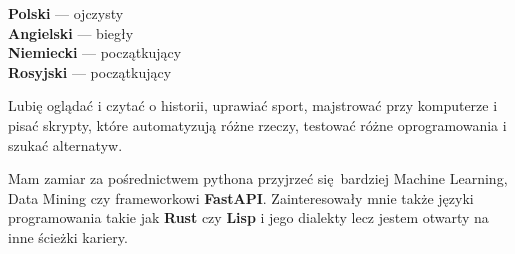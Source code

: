 \documentclass[9pt]{developercv} %
\begin{document}

\begin{minipage}[t]{0.3\textwidth}
    \vspace{-\baselineskip} %

    \textbf{Polski} --- ojczysty\\
    \textbf{Angielski} --- biegły\\
    \textbf{Niemiecki} --- początkujący\\
    \textbf{Rosyjski} --- początkujący
\end{minipage}
\hfill
\begin{minipage}[t]{0.3\textwidth}
    \vspace{-\baselineskip} %

    Lubię oglądać i czytać o historii, uprawiać sport, majstrować przy komputerze i pisać skrypty, które automatyzują różne rzeczy, testować różne oprogramowania i szukać alternatyw.
\end{minipage}
\hfill
\begin{minipage}[t]{0.3\textwidth}
	\vspace{-\baselineskip} %


    Mam zamiar za pośrednictwem pythona przyjrzeć się bardziej Machine Learning, Data Mining czy frameworkowi \textbf{FastAPI}. Zainteresowały mnie także języki programowania takie jak \textbf{Rust} czy \textbf{Lisp} i jego dialekty lecz jestem otwarty na inne ścieżki kariery.
\end{minipage}

\end{document}
